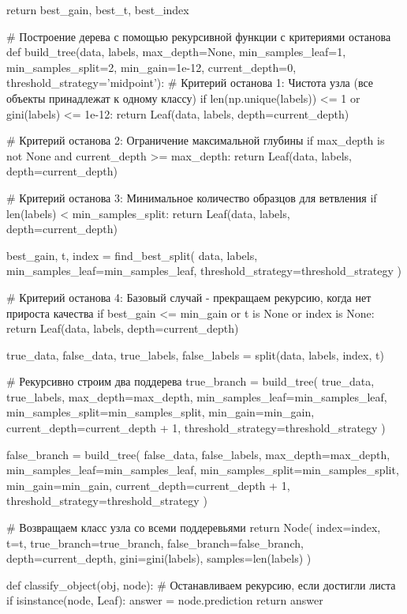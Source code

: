 \documentclass[14pt,a4paper]{extarticle}
\begin{document}
\begin{CodeListing}
    return best_gain, best_t, best_index


# Построение дерева с помощью рекурсивной функции с критериями останова
def build_tree(data, labels, max_depth=None, min_samples_leaf=1, min_samples_split=2,
               min_gain=1e-12, current_depth=0, threshold_strategy='midpoint'):
    # Критерий останова 1: Чистота узла (все объекты принадлежат к одному классу)
    if len(np.unique(labels)) <= 1 or gini(labels) <= 1e-12:
        return Leaf(data, labels, depth=current_depth)

    # Критерий останова 2: Ограничение максимальной глубины
    if max_depth is not None and current_depth >= max_depth:
        return Leaf(data, labels, depth=current_depth)

    # Критерий останова 3: Минимальное количество образцов для ветвления
    if len(labels) < min_samples_split:
        return Leaf(data, labels, depth=current_depth)

    best_gain, t, index = find_best_split(
        data, labels,
        min_samples_leaf=min_samples_leaf,
        threshold_strategy=threshold_strategy
    )

    # Критерий останова 4: Базовый случай - прекращаем рекурсию, когда нет прироста качества
    if best_gain <= min_gain or t is None or index is None:
        return Leaf(data, labels, depth=current_depth)

    true_data, false_data, true_labels, false_labels = split(data, labels, index, t)

    # Рекурсивно строим два поддерева
    true_branch = build_tree(
        true_data, true_labels,
        max_depth=max_depth,
        min_samples_leaf=min_samples_leaf,
        min_samples_split=min_samples_split,
        min_gain=min_gain,
        current_depth=current_depth + 1,
        threshold_strategy=threshold_strategy
    )

    false_branch = build_tree(
        false_data, false_labels,
        max_depth=max_depth,
        min_samples_leaf=min_samples_leaf,
        min_samples_split=min_samples_split,
        min_gain=min_gain,
        current_depth=current_depth + 1,
        threshold_strategy=threshold_strategy
    )

    # Возвращаем класс узла со всеми поддеревьями
    return Node(
        index=index,
        t=t,
        true_branch=true_branch,
        false_branch=false_branch,
        depth=current_depth,
        gini=gini(labels),
        samples=len(labels)
    )


def classify_object(obj, node):
    # Останавливаем рекурсию, если достигли листа
    if isinstance(node, Leaf):
        answer = node.prediction
        return answer


\end{CodeListing}
\end{document}
